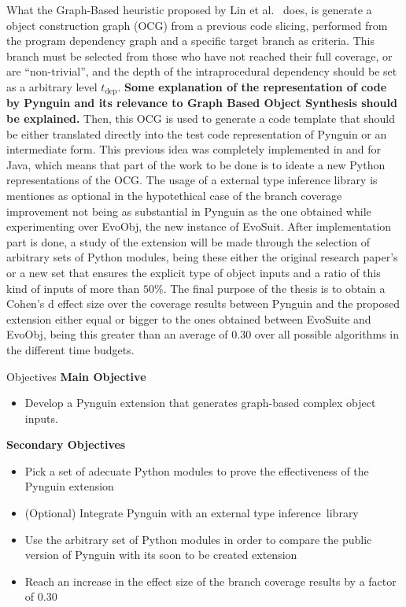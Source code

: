 \documentclass[%
  chapterprefix=false,%
  open=right,%
  twoside=true,%
  paper=a4,%
  logofile={Figures/logo.png},%
  thesistype=master,%
  UKenglish,%
]{se2thesis}
\begin{document}
What the Graph-Based heuristic proposed by Lin et al.~\cite{DBLP:conf/sigsoft/0001O00D21} does, is generate a object construction graph (OCG) from a previous code slicing, performed from the program dependency graph and a specific target branch as criteria.
This branch must be selected from those who have not reached their full coverage, or are ``non-trivial'', and the depth of the intraprocedural dependency should be set as a arbitrary level $t_{\text{dep}}$.
\textbf{Some explanation of the representation of code by Pynguin and its relevance to Graph Based Object Synthesis should be explained.}
Then, this OCG is used to generate a code template that should be either translated directly into the test code representation of Pynguin or an intermediate form.
This previous idea was completely implemented in and for Java, which means that part of the work to be done is to ideate a new Python representations of the OCG.\@
The usage of a external type inference library is mentiones as optional in the hypotethical case of the branch coverage improvement not being as substantial in Pynguin as the one obtained while experimenting over EvoObj, the new instance of EvoSuit.
After implementation part is done, a study of the extension will be made through the selection of arbitrary sets of Python modules, being these either the original research paper's or a new set that ensures the explicit type of object inputs and a ratio of this kind of inputs of more than $50\%$.
The final purpose of the thesis is to obtain a Cohen's d effect size over the coverage results between Pynguin and the proposed extension either equal or bigger to the ones obtained between EvoSuite and EvoObj, being this greater than an average of $0.30$ over all possible algorithms in the different time budgets.



\begin{summary}{Objectives}
\centering\textbf{Main Objective}
\begin{itemize}
\item  Develop a Pynguin extension that generates graph-based complex object inputs.
\end{itemize}
\centering\textbf{Secondary Objectives}
\begin{itemize}
\item  Pick a set of adecuate Python modules to prove the effectiveness of the Pynguin extension
\item (Optional) Integrate Pynguin with an external type inference~library
\item Use the arbitrary set of Python modules in order to compare the public version of Pynguin with its soon to be created extension
\item Reach an increase in the effect size of the branch coverage results by a factor of $0.30$
\end{itemize}
\end{summary}
\end{document}
